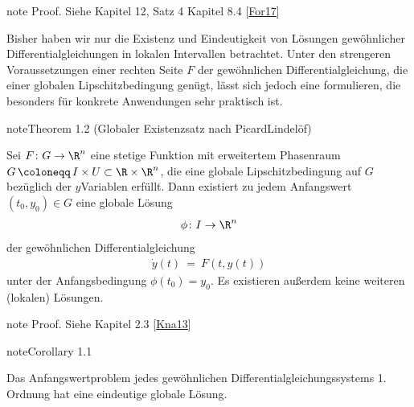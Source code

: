 \documentclass[letterpaper,10pt,english]{jupyterBook}
\begin{document}
\begin{sphinxadmonition}{note}
\sphinxAtStartPar
Proof. Siehe Kapitel 12, Satz 4 Kapitel 8.4 {[}\hyperlink{cite.references:id4}{For17}{]}
\end{sphinxadmonition}

\sphinxAtStartPar
Bisher haben wir nur die Existenz und Eindeutigkeit von Lösungen gewöhnlicher Differentialgleichungen in lokalen Intervallen betrachtet.
Unter den strengeren Voraussetzungen einer rechten Seite \(F\) der gewöhnlichen Differentialgleichung, die einer globalen Lipschitzbedingung genügt, lässt sich jedoch eine  formulieren, die besonders für konkrete Anwendungen sehr praktisch ist.
\label{ode/repetition:satz:picardlindeloef}
\begin{sphinxadmonition}{note}{Theorem 1.2 (Globaler Existenzsatz nach Picard\sphinxhyphen{}Lindelöf)}



\sphinxAtStartPar
Sei \(F\colon G\to\R^n\) eine stetige Funktion mit erweitertem Phasenraum \(G \, \coloneqq \, I \times U \subset \R\times\R^n\), die eine globale Lipschitzbedingung auf \(G\) bezüglich der \(y\)\sphinxhyphen{}Variablen erfüllt.
Dann existiert zu jedem Anfangswert \((t_0,y_0) \in G\) eine globale Lösung
\begin{equation*}
\begin{split}\phi \colon I \to \R^n\end{split}
\end{equation*}
\sphinxAtStartPar
der gewöhnlichen Differentialgleichung
\begin{equation*}
\begin{split}\dot{y}(t) \ = \ F(t,y(t))\end{split}
\end{equation*}
\sphinxAtStartPar
unter der Anfangsbedingung \(\phi(t_0)=y_0\).
Es existieren außerdem keine weiteren (lokalen) Lösungen.
\end{sphinxadmonition}

\begin{sphinxadmonition}{note}
\sphinxAtStartPar
Proof. Siehe Kapitel 2.3 {[}\hyperlink{cite.references:id5}{Kna13}{]}
\end{sphinxadmonition}
\label{ode/repetition:cor:eindeutigkeit_linear}
\begin{sphinxadmonition}{note}{Corollary 1.1}



\sphinxAtStartPar
Das Anfangswertproblem jedes  gewöhnlichen Differentialgleichungssystems 1. Ordnung hat eine eindeutige globale Lösung.
\end{sphinxadmonition}
\end{document}
